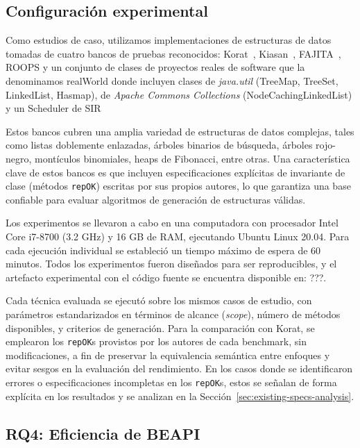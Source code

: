 \subsection{Configuración experimental}

Como estudios de caso, utilizamos implementaciones de estructuras de datos tomadas de cuatro bancos 
de pruebas reconocidos: \textsf{Korat}~\cite{Boyapati02}, \textsf{Kiasan}~\cite{Deng06}, 
\textsf{FAJITA}~\cite{Abad13}, \textsf{ROOPS} y un conjunto de clases de proyectos reales de software que la denominamos \textsf{realWorld}
donde incluyen clases de \emph{java.util} (TreeMap, TreeSet, LinkedList, Hasmap), de \emph{Apache Commons Collections} (NodeCachingLinkedList) y un Scheduler de SIR

Estos bancos cubren una amplia variedad de estructuras de datos complejas, tales como listas doblemente enlazadas, árboles binarios de búsqueda, 
árboles rojo-negro, montículos binomiales, heaps de Fibonacci, entre otras. Una característica clave 
de estos bancos es que incluyen especificaciones explícitas de invariante de clase (métodos 
\texttt{repOK}) escritas por sus propios autores, lo que garantiza una base confiable para evaluar 
algoritmos de generación de estructuras válidas.

Los experimentos se llevaron a cabo en una computadora con procesador Intel Core i7-8700 
(3.2 GHz) y 16 GB de RAM, ejecutando Ubuntu Linux 20.04. Para cada ejecución individual se estableció 
un tiempo máximo de espera de 60 minutos. Todos los experimentos fueron diseñados para ser reproducibles, 
y el artefacto experimental con el código fuente se encuentra disponible en: ???.

Cada técnica evaluada se ejecutó sobre los mismos casos de estudio, con parámetros estandarizados 
en términos de alcance (\textit{scope}), número de métodos disponibles, y criterios de generación. 
Para la comparación con \textsf{Korat}, se emplearon los \texttt{repOK}s provistos por los autores 
de cada benchmark, sin modificaciones, a fin de preservar la equivalencia semántica entre enfoques 
y evitar sesgos en la evaluación del rendimiento. En los casos donde se identificaron errores o 
especificaciones incompletas en los \texttt{repOK}s, estos se señalan de forma explícita en los 
resultados y se analizan en la Sección~\ref{sec:existing-specs-analysis}.



\subsection{RQ4: Eficiencia de BEAPI}

